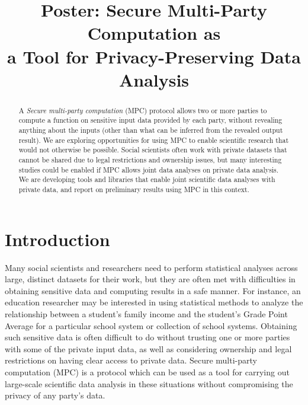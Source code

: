 \documentclass[conference]{IEEEtran}
\begin{document}
\title{Poster: Secure Multi-Party Computation as\\ a Tool for Privacy-Preserving Data Analysis}

\author{

}
\maketitle


\begin{abstract}
A \emph{Secure multi-party computation} (MPC) protocol allows two or more parties to compute a function on sensitive input data provided by each party, without revealing anything about the inputs (other than what can be inferred from the revealed output result). 
We are exploring opportunities for using MPC to enable scientific research 
that would not otherwise be possible. Social scientists often work with private
datasets that cannot be shared due to legal restrictions and ownership
issues, but many interesting studies could be enabled if MPC allows
joint data analyses on private data analysis. We are developing tools
and libraries that enable joint scientific data analyses with private
data, and report on preliminary results using MPC in this context.

\end{abstract}

\section{Introduction}
Many social scientists and researchers need to perform statistical analyses across 
large, distinct datasets for their work, but they are often met with difficulties in
obtaining sensitive data and computing results in a safe manner.
For instance, an education researcher may be interested in using statistical methods 
to analyze the relationship between a student's family income and the student's 
Grade Point Average for a particular school system or collection of school systems. 
Obtaining such sensitive data is often difficult to do without trusting 
one or more parties with some of the private input data, as well as considering
ownership and legal restrictions on having clear access to private data.
Secure multi-party computation (MPC) is a protocol which can be used as a tool 
for carrying out large-scale scientific data analysis in these situations without
compromising the privacy of any party's data.
\end{document}
